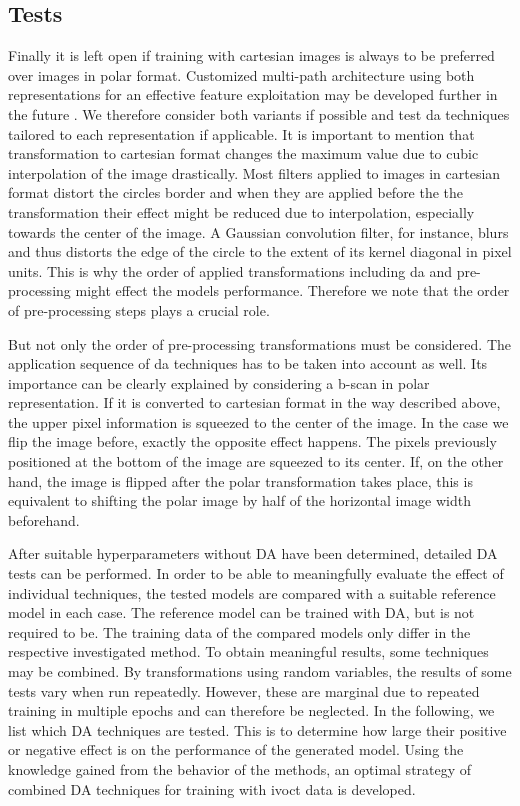 \subsection{Tests}

Finally it is left open if training with cartesian images is always to be preferred over images in polar format. Customized multi-path architecture using both representations for an effective feature exploitation may be developed further in the future \cite{Gessert.2018}. We therefore consider both variants if possible and test \acrshort{da} techniques tailored to each representation if applicable. It is important to mention that transformation to cartesian format changes the maximum value due to cubic \gls{interpolation} of the image drastically. Most filters applied to images in cartesian format distort the circles border and when they are applied before the the transformation their effect might be reduced due to \gls{interpolation}, especially towards the center of the image. A Gaussian convolution filter, for instance, blurs and thus distorts the edge of the circle to the extent of its kernel diagonal in pixel units. This is why the order of applied transformations including \acrshort{da} and pre-processing might effect the models performance. Therefore we note that the order of pre-processing steps plays a crucial role.

But not only the order of pre-processing transformations must be considered. The application sequence of \acrshort{da} techniques has to be taken into account as well. Its importance can be clearly explained by considering a \gls{b-scan} in polar representation. If it is converted to cartesian format in the way described above, the upper pixel information is squeezed to the center of the image. In the case we flip the image before, exactly the opposite effect happens. The pixels previously positioned at the bottom of the image are squeezed to its center. If, on the other hand, the image is flipped after the polar transformation takes place, this is equivalent to shifting the polar image by half of the horizontal image width beforehand.

After suitable hyperparameters without DA have been determined, detailed DA tests can be performed. In order to be able to meaningfully evaluate the effect of individual techniques, the tested models are compared with a suitable reference model in each case. The reference model can be trained with DA, but is not required to be. The training data of the compared models only differ in the respective investigated method. To obtain meaningful results, some techniques may be combined. By transformations using random variables, the results of some tests vary when run repeatedly. However, these are marginal due to repeated training in multiple epochs and can therefore be neglected. In the following, we list which DA techniques are tested. This is to determine how large their positive or negative effect is on the performance of the generated model. Using the knowledge gained from the behavior of the methods, an optimal strategy of combined DA techniques for training with \acrshort{ivoct} data is developed.  

